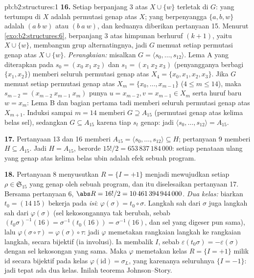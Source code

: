 \begin{solution}{pb:b2:structures:1}
\textbf{16.} Setiap  berpanjang $3$ atas $X \cup \{w\}$ terletak
di $G$: yang tertumpu di $X$ adalah permutasi genap atas $X$; yang
berpenyangga $\{a, b, w\}$ adalah $(a\ b\ w)$ atau $(b\ a\ w)$, dan
keduanya diberikan pertanyaan 15. Menurut \cref{exo:b2:structures:6},
 berpanjang $3$ atas himpunan berhuruf $(k+1)$, yaitu $X \cup
\{w\}$, membangun grup alternatingnya, jadi $G$ memuat setiap
permutasi genap atas $X \cup \{w\}$. \emph{Perangkaian:} misalkan $G =
\langle s_0, \dots, s_{12}\rangle$. Lema A yang diterapkan pada $s_0 =
(x_0\ x_1\ x_2)$ dan $s_1 = (x_1\ x_2\ x_3)$ (penyangganya berbagi
$\{x_1, x_2\}$) memberi seluruh permutasi genap atas $X_4 = \{x_0, x_1,
x_2, x_3\}$. Jika $G$ memuat setiap permutasi genap atas $X_m = \{x_0,
\dots, x_{m-1}\}$ ($4 \leq m \leq 14$), maka $s_{m-2} = (x_{m-2}\
x_{m-1}\ x_m)$ punya $u = x_{m-2}, v = x_{m-1} \in X_m$ serta huruf
baru $w = x_m$: Lema B dan bagian pertama tadi memberi seluruh permutasi
genap atas $X_{m+1}$. Induksi sampai $m = 14$ memberi $G \supseteq
A_{15}$ (permutasi genap atas kelima belas sel), sedangkan $G
\subseteq A_{15}$ karena tiap $s_t$ genap: jadi $\langle s_0, \dots,
s_{12}\rangle = A_{15}$.

\textbf{17.} Pertanyaan 13 dan 16 memberi $A_{15} = \langle s_0, \dots,
s_{12}\rangle \subseteq H$; pertanyaan 9 memberi $H \subseteq A_{15}$.
Jadi $H = A_{15}$, berorde $15!/2 = 653\,837\,184\,000$: setiap penataan
ulang yang genap atas kelima belas ubin adalah efek sebuah program.

\textbf{18.} Pertanyaan 8 menyusutkan $R = \{I = +1\}$ menjadi
mewujudkan setiap $\rho \in \mathfrak{S}_{15}$ yang genap oleh sebuah
program, dan itu diselesaikan pertanyaan 17. Bersama pertanyaan 6,
$\abs R = 16!/2 = 10\,461\,394\,944\,000$. \emph{Dua kelas:} biarkan
$t_0 = (14\ 15)$ bekerja pada \emph{isi}: $\varphi(\sigma) = t_0 \circ
\sigma$. Langkah sah dari $\sigma$ juga langkah sah dari
$\varphi(\sigma)$ (sel kekosongannya tak berubah, sebab
$(t_0\sigma)^{-1}(16) = \sigma^{-1}(t_0(16)) = \sigma^{-1}(16)$,
dan sel yang digeser pun sama), lalu $\varphi(\sigma \circ \tau)
= \varphi(\sigma) \circ \tau$: jadi $\varphi$ memetakan rangkaian
langkah ke rangkaian langkah, secara bijektif (ia involusi). Ia
membalik $I$, sebab $\varepsilon(t_0\sigma) = -\varepsilon(\sigma)$
dengan sel kekosongan yang sama. Maka $\varphi$ memetakan kelas $R =
\{I = +1\}$ milik $\mathrm{id}$ secara bijektif pada kelas
$\varphi(\mathrm{id}) = \sigma_L$, yang karenanya seluruhnya $\{I =
-1\}$: jadi tepat ada dua kelas. Inilah teorema Johnson--Story.


\end{solution}
